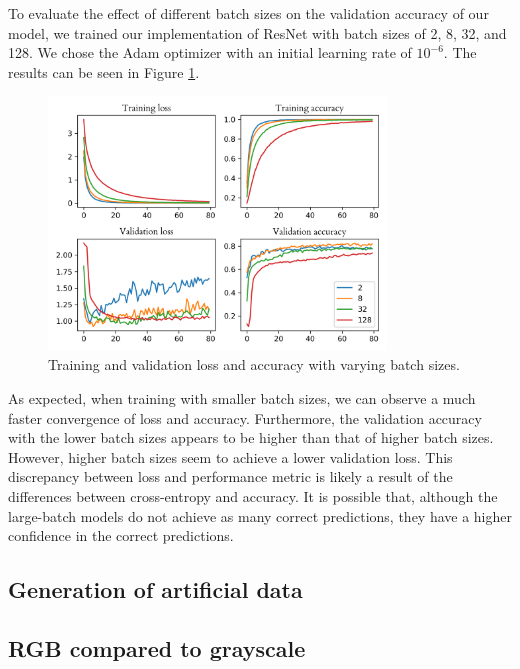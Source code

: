 \documentclass{l4proj}
\begin{document}
To evaluate the effect of different batch sizes on the validation accuracy of our model, we trained our implementation of ResNet with batch sizes of 2, 8, 32, and 128. We chose the Adam optimizer with an initial learning rate of $10^{-6}$. The results can be seen in Figure \ref{fig:batch_size}.

\begin{figure}[ht]
  \centering
  \includegraphics[width=0.8\textwidth]{images/evaluation/batch_size/history.png}
  \caption{Training and validation loss and accuracy with varying batch sizes.}
  \label{fig:batch_size}
\end{figure}

As expected, when training with smaller batch sizes, we can observe a much faster convergence of loss and accuracy. Furthermore, the validation accuracy with the lower batch sizes appears to be higher than that of higher batch sizes. However, higher batch sizes seem to achieve a lower validation loss. This discrepancy between loss and performance metric is likely a result of the differences between cross-entropy and accuracy. It is possible that, although the large-batch models do not achieve as many correct predictions, they have a higher confidence in the correct predictions.


\subsection{Generation of artificial data}


\subsection{RGB compared to grayscale}
\end{document}
